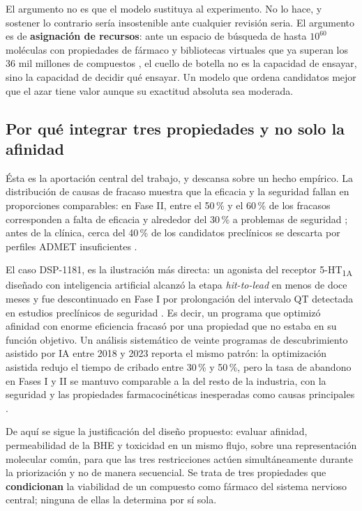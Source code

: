 El argumento no es que el modelo sustituya al experimento. No lo hace, y
sostener lo contrario sería insostenible ante cualquier revisión seria. El
argumento es de \textbf{asignación de recursos}: ante un espacio de búsqueda de
hasta $10^{60}$ moléculas con propiedades de fármaco y bibliotecas virtuales que
ya superan los 36 mil millones de compuestos \cite{hasselgren_artificial_2024}, el cuello
de botella no es la capacidad de ensayar, sino la capacidad de decidir qué
ensayar. Un modelo que ordena candidatos mejor que el azar tiene valor aunque su
exactitud absoluta sea moderada.

\subsection{Por qué integrar tres propiedades y no solo la afinidad}
\label{sec:just-integracion}

Ésta es la aportación central del trabajo, y descansa sobre un hecho empírico.
La distribución de causas de fracaso muestra que la eficacia y la seguridad
fallan en proporciones comparables: en Fase II, entre el 50\,\% y el 60\,\% de
los fracasos corresponden a falta de eficacia y alrededor del 30\,\% a
problemas de seguridad \cite{mao_artificial_2026}; antes de la clínica, cerca del
40\,\% de los candidatos preclínicos se descarta por perfiles ADMET
insuficientes \cite{zhang_computational_2025}.

El caso DSP-1181, es la ilustración más directa: un agonista del receptor 5-HT\textsubscript{1A} diseñado con
inteligencia artificial alcanzó la etapa \textit{hit-to-lead} en menos de doce
meses y fue descontinuado en Fase I por prolongación del intervalo QT detectada
en estudios preclínicos de seguridad \cite{mao_artificial_2026}. Es decir, un programa
que optimizó afinidad con enorme eficiencia fracasó por una propiedad que no
estaba en su función objetivo. Un análisis sistemático de veinte programas de
descubrimiento asistido por IA entre 2018 y 2023 reporta el mismo patrón: la
optimización asistida redujo el tiempo de cribado entre 30\,\% y 50\,\%, pero la
tasa de abandono en Fases I y II se mantuvo comparable a la del resto de la
industria, con la seguridad y las propiedades farmacocinéticas inesperadas como
causas principales \cite{mao_artificial_2026}.

De aquí se sigue la justificación del diseño propuesto: evaluar afinidad,
permeabilidad de la BHE y toxicidad en un mismo flujo, sobre una representación
molecular común, para que las tres restricciones actúen simultáneamente durante
la priorización y no de manera secuencial. Se trata de tres propiedades que
\textbf{condicionan} la viabilidad de un compuesto como fármaco del sistema
nervioso central; ninguna de ellas la determina por sí sola.

